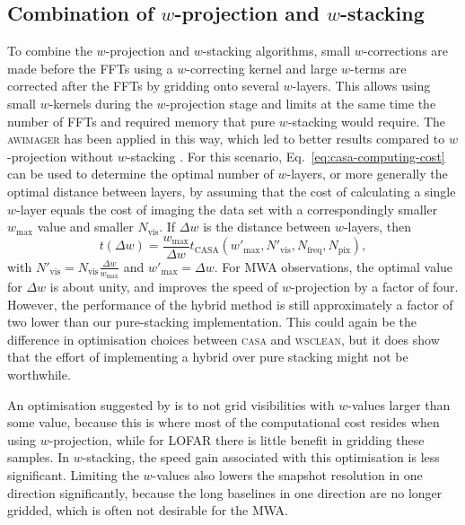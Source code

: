 \documentclass[useAMS,usenatbib]{mn2e}
\begin{document}
\subsection{Combination of $w$-projection and $w$-stacking}
To combine the $w$-projection and $w$-stacking algorithms, small $w$-corrections are made before the FFTs using a $w$-correcting kernel and large $w$-terms are corrected after the FFTs by gridding onto several $w$-layers. This allows using small $w$-kernels during the $w$-projection stage and limits at the same time the number of FFTs and required memory that pure $w$-stacking would require. The \textsc{awimager} has been applied in this way, which led to better results compared to $w$-projection without $w$-stacking \citep{awimager-2013}. For this scenario, Eq.~\eqref{eq:casa-computing-cost} can be used to determine the optimal number of $w$-layers, or more generally the optimal distance between layers, by assuming that the cost of calculating a single $w$-layer equals the cost of imaging the data set with a correspondingly smaller $w_{\max}$ value and smaller $N_\textrm{vis}$. If $\Delta w$ is the distance between $w$-layers, then 
\begin{equation}
t(\Delta w) = \frac{w_{\max}}{\Delta w} t_\textrm{CASA}(w'_{\max},N'_\textrm{vis},N_\textrm{freq},N_\textrm{pix}),
\end{equation}
with $N'_\textrm{vis} = N_\textrm{vis}\frac{\Delta w}{w_{\max}}$ and $w'_{\max} = \Delta w$. For MWA observations, the optimal value for $\Delta w$ is about unity, and improves the speed of $w$-projection by a factor of four. However, the performance of the hybrid method is still approximately a factor of two lower than our pure-stacking implementation. This could again be the difference in optimisation choices between \textsc{casa} and \textsc{wsclean}, but it does show that the effort of implementing a hybrid over pure stacking might not be worthwhile.

An optimisation suggested by \citet{awimager-2013} is to not grid visibilities with $w$-values larger than some value, because this is where most of the computational cost resides when using $w$-projection, while for LOFAR there is little benefit in gridding these samples. In $w$-stacking, the speed gain associated with this optimisation is less significant. Limiting the $w$-values also lowers the snapshot resolution in one direction significantly, because the long baselines in one direction are no longer gridded, which is often not desirable for the MWA.
\end{document}
